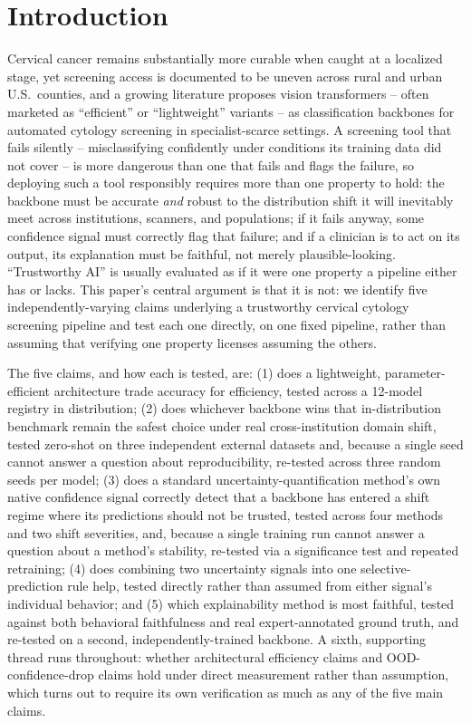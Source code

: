 \documentclass[runningheads]{llncs}
\begin{document}
\section{Introduction}

Cervical cancer remains substantially more curable when caught at a
localized stage, yet screening access is documented to be uneven across
rural and urban U.S.\ counties, and a growing literature proposes vision
transformers -- often marketed as ``efficient'' or ``lightweight''
variants -- as classification backbones for automated cytology screening
in specialist-scarce settings. A screening tool that fails silently --
misclassifying confidently under conditions its training data did not
cover -- is more dangerous than one that fails and flags the failure, so
deploying such a tool responsibly requires more than one property to hold:
the backbone must be accurate \emph{and} robust to the distribution shift
it will inevitably meet across institutions, scanners, and populations;
if it fails anyway, some confidence signal must correctly flag that
failure; and if a clinician is to act on its output, its explanation must
be faithful, not merely plausible-looking. ``Trustworthy AI'' is usually
evaluated as if it were one property a pipeline either has or lacks. This
paper's central argument is that it is not: we identify five
independently-varying claims underlying a trustworthy cervical cytology
screening pipeline and test each one directly, on one fixed pipeline,
rather than assuming that verifying one property licenses assuming the
others.

The five claims, and how each is tested, are: (1) does a lightweight,
parameter-efficient architecture trade accuracy for efficiency, tested
across a 12-model registry in distribution; (2) does whichever backbone
wins that in-distribution benchmark remain the safest choice under real
cross-institution domain shift, tested zero-shot on three independent
external datasets and, because a single seed cannot answer a question
about reproducibility, re-tested across three random seeds per model;
(3) does a standard uncertainty-quantification method's own native
confidence signal correctly detect that a backbone has entered a shift
regime where its predictions should not be trusted, tested across four
methods and two shift severities, and, because a single training run
cannot answer a question about a method's stability, re-tested via a
significance test and repeated retraining; (4) does combining two
uncertainty signals into one selective-prediction rule help, tested
directly rather than assumed from either signal's individual behavior;
and (5) which explainability method is most faithful, tested against both
behavioral faithfulness and real expert-annotated ground truth, and
re-tested on a second, independently-trained backbone. A sixth,
supporting thread runs throughout: whether architectural efficiency claims
and OOD-confidence-drop claims hold under direct measurement rather than
assumption, which turns out to require its own verification as much as
any of the five main claims.
\end{document}
